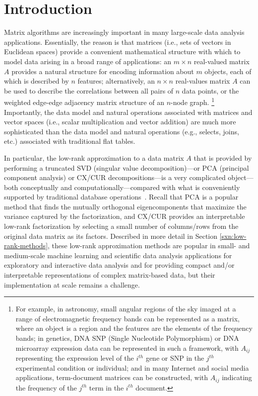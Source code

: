 \section{Introduction}
\label{sec:intro}

Matrix algorithms are increasingly important in many large-scale data analysis applications.  
Essentially, the reason is that matrices (i.e., sets of vectors in Euclidean spaces) provide a convenient mathematical structure with which to model data arising in a broad range of applications:
an $m \times n$ real-valued matrix $A$ provides a natural structure for
encoding information about $m$ objects, each of which is described by $n$
features;
alternatively, an $n \times n$ real-values matrix $A$ can be used to describe
the correlations between all pairs of $n$ data points, or the weighted
edge-edge adjacency matrix structure of an $n$-node graph.%
\footnote{For example, in astronomy, small angular regions of the sky imaged at a range of electromagnetic frequency bands can be represented as a matrix, where an object is a region and the features are the elements of the frequency bands;
in genetics, DNA SNP (Single Nucleotide Polymorphism) or DNA microarray expression data can be represented in such a framework, with $A_{ij}$ representing the expression level of the $i^{th}$ gene or SNP in the $j^{th}$ experimental condition or individual; and
in many Internet and social media applications, term-document matrices can be constructed, with $A_{ij}$ indicating the frequency of the $j^{th}$ term in the $i^{th}$ document.}
Importantly, the data model and natural operations associated with matrices and vector spaces (i.e., scalar multiplication and vector addition) are much more sophisticated than the data model and natural operations (e.g., selects, joins, etc.) associated with traditional flat tables.

In particular, the low-rank approximation to a data matrix $A$ that is provided by performing a truncated SVD (singular value decomposition)---or PCA (principal component analysis) or CX/CUR decompositions---is a very complicated object---both conceptually and computationally---compared with what is conveniently supported by traditional database operations~\cite{Skillicorn07}.
Recall that PCA is a popular method that finds the mutually orthogonal eigencomponents that maximize the variance captured by the factorization, and CX/CUR provides an interpretable low-rank factorization by selecting a small number of columns/rows from the original data matrix as its factors.
Described in more detail in Section \ref{sxn:low-rank-methods}, these low-rank approximation methods are popular in small- and medium-scale machine learning and scientific data analysis applications for exploratory and interactive data analysis and for providing compact and/or interpretable representations of complex matrix-based data, but their implementation at scale remains a challenge.

